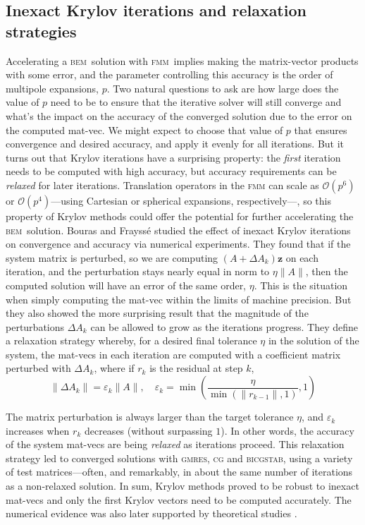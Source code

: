 \documentclass[final,leqno,]{siamltex1213}
\newcommand{\bem}{\textsc{bem}\xspace}
\newcommand{\fmm}{\textsc{fmm}\xspace}
\renewcommand{\O}[1]{\mathcal{O}(#1)}
\newcommand{\gmres}{\textsc{gmres}\xspace}
\newcommand{\vect}[1]{\mathbf{#1}}
\begin{document}
\subsection{Inexact Krylov iterations and relaxation strategies}

Accelerating a \bem\ solution with \fmm\ implies making the matrix-vector products with some error, and the parameter controlling this accuracy is the order of multipole expansions, $p$. 
Two natural questions to ask are how large does the value of $p$ need to be to ensure that the iterative solver will still converge and what's the impact on the accuracy of the converged solution due to the error on the computed mat-vec.
We might expect to choose that value of $p$ that ensures convergence and desired accuracy, and apply it evenly for all iterations. 
But it turns out that Krylov iterations have a surprising property: the \emph{first} iteration needs to be computed with high accuracy, but accuracy requirements can be \emph{relaxed} for later iterations. 
Translation operators in the \fmm can scale as $\O{p^{6}}$ or $\O{p^{4}}$---using Cartesian or spherical expansions, respectively---, so this property of Krylov methods could offer the potential for further accelerating the \bem\ solution.
Bouras and Frayss{\'e} \cite{bouras2000relaxation,bourasfraysse2005} studied the effect of inexact Krylov iterations on convergence and accuracy via numerical experiments.
They found that if the system matrix is perturbed, so we are computing $(A+\Delta A_k)\vect{z}$ on each iteration, and the perturbation stays nearly equal in norm to $\eta \|A\|$, then the computed solution will have an error of the same order, $\eta$. This is the situation when simply computing the mat-vec within the limits of machine precision. But they also showed the more surprising result that the magnitude of the perturbations $\Delta A_k$ can be allowed to grow as the iterations progress.
They define a relaxation strategy whereby, for a desired final tolerance $\eta$ in the solution of the system, the mat-vecs in each iteration are computed with a coefficient matrix perturbed with $\Delta A_k$, where if $r_k$ is the residual at step $k$,
%
\begin{equation}\label{eqn:matrix-perturbation}
  \|\Delta A_k\| = \varepsilon_k\|A\|, \quad \varepsilon_k=\min\left( \frac{\eta}{\min(\|r_{k-1}\|,1)}, 1\right) 
\end{equation}

\noindent The matrix perturbation is always larger than the target tolerance $\eta$, and $\varepsilon_k$ increases when $r_k$ decreases (without surpassing $1$). In other words, the accuracy of the system mat-vecs are being \emph{relaxed} as iterations proceed. This relaxation strategy led to converged solutions with \gmres, \textsc{cg} and \textsc{bicgstab}, using a variety of test matrices---often, and remarkably, in about the same number of iterations as a non-relaxed solution. In sum, Krylov methods proved to be robust to inexact mat-vecs and only the first Krylov vectors need to be computed accurately.
The numerical evidence was also later supported by theoretical studies \cite{simonciniszyld2003,vandeneshofsleijpen2004}.
\end{document}
